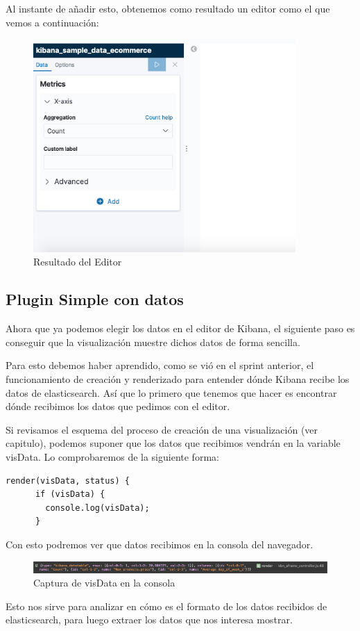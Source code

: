\documentclass[a4paper, 12pt]{book}
\begin{document}
Al instante de añadir esto, obtenemos como resultado un editor como el que vemos a continuación:

\begin{figure}[H]
  \centering
  \includegraphics[width=10cm, keepaspectratio]{img/development/editor-resultado.png}
  \caption{Resultado del Editor}
  \label{fig:editor}
\end{figure}

\subsection{Plugin Simple con datos}
Ahora que ya podemos elegir los datos en el editor de Kibana, el siguiente paso es conseguir que la visualización muestre dichos datos de forma sencilla.

Para esto debemos haber aprendido, como se vió en el sprint anterior, el funcionamiento de creación y renderizado para entender dónde Kibana recibe los datos de elasticsearch. Así que lo primero que tenemos que hacer es encontrar dónde recibimos los datos que pedimos con el editor.

Si revisamos el esquema del proceso de creación de una visualización (ver capitulo), podemos suponer que los datos que recibimos vendrán en la variable visData. Lo comprobaremos de la siguiente forma:

\begin{lstlisting}[frame=single]
  render(visData, status) {
      if (visData) {
        console.log(visData);
      }
\end{lstlisting}

Con esto podremos ver que datos recibimos en la consola del navegador.

\begin{figure}[H]
  \centering
  \includegraphics[width=16cm, keepaspectratio]{img/development/captura-visData.png}
  \caption{Captura de visData en la consola}
  \label{fig:visData}
\end{figure}
Esto nos sirve para analizar en cómo es el formato de los datos recibidos de elasticsearch, para luego extraer los datos que nos interesa mostrar. 
\end{document}
